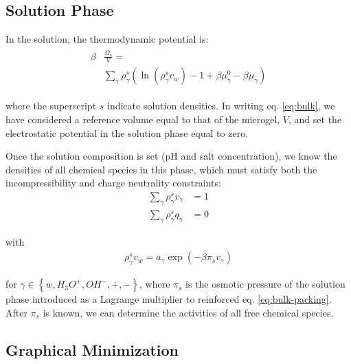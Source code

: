 \subsection{Solution Phase}

In the solution, the thermodynamic potential is:
%
%
\begin{align}
\begin{aligned}
\beta&\frac{\Omega_s}{V}=\\& \sum_{\gamma   } {\rho^s_\gamma\left(\ln(\rho_\gamma^sv_w) -1 + \beta\mu_\gamma^0 - \beta\mu_\gamma\right)}
\end{aligned}
\label{eq:bulk}
\end{align}

\noindent where the superscript $s$ indicate solution densities.
In writing eq. \ref{eq:bulk}, we have considered a reference volume equal to that of the microgel, $V$, and set the electrostatic potential in the solution phase equal to zero.




Once the solution composition is set (pH and salt concentration), we know the densities of all chemical species in this phase, which must satisfy both the incompressibility and charge neutrality constraints: 
%
%
\begin{align}
\sum_{\gamma  } \rho_\gamma^s v_\gamma  &=1\label{eq:bulk-packing}\\
\sum_{\gamma  } \rho_\gamma^s q_\gamma  &=0
\end{align}

\noindent with
%
%
\begin{align}
\rho_\gamma^s v_w= a_\gamma \exp(-\beta\pi_s v_\gamma)
\label{eq:bulk-electroneutrality}
\end{align}



\noindent for $\gamma \in \left\{ w, H_3O^+, OH^-, +,- \right\}$, where $\pi_s$ is the osmotic pressure of the solution phase introduced as a Lagrange multiplier to reinforced eq. \ref{eq:bulk-packing}.
After $\pi_s$ is known, we can determine the activities of all free chemical species.

\subsection{Graphical Minimization}

